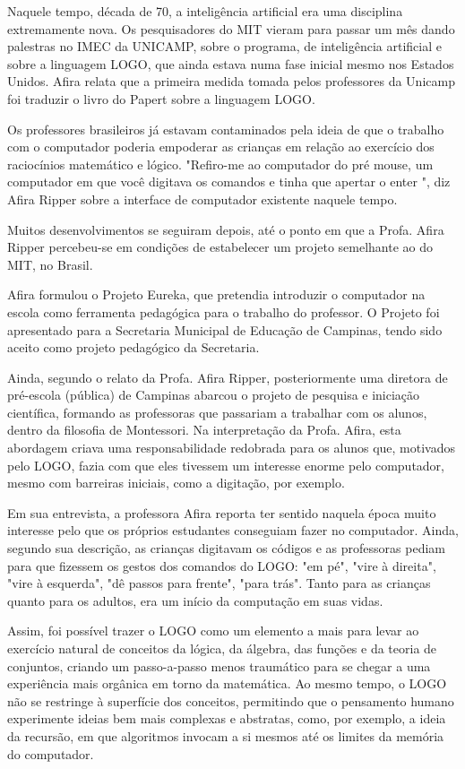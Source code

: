 Naquele tempo, década de 70, a inteligência artificial era uma disciplina extremamente nova. Os pesquisadores do MIT vieram para passar um mês dando palestras no IMEC da UNICAMP, sobre o programa, de inteligência artificial e sobre a linguagem LOGO, que ainda estava numa fase inicial mesmo nos Estados Unidos. Afira relata que a primeira medida tomada pelos professores da Unicamp foi traduzir o livro do Papert sobre a linguagem LOGO.

Os professores brasileiros já estavam contaminados pela ideia de que o trabalho com o computador poderia empoderar as crianças em relação ao exercício dos raciocínios matemático e lógico. "Refiro-me ao computador do pré mouse, um computador em que você digitava os comandos e tinha que apertar o enter ", diz Afira Ripper sobre a interface de computador existente naquele tempo.

Muitos desenvolvimentos se seguiram depois, até o ponto em que a Profa. Afira Ripper percebeu-se em condições de estabelecer um projeto semelhante ao do MIT, no Brasil.

Afira formulou o Projeto Eureka, que pretendia introduzir o computador na escola como ferramenta pedagógica para o trabalho do professor. O Projeto foi apresentado para a Secretaria Municipal de Educação de Campinas, tendo sido aceito como projeto pedagógico da Secretaria.

Ainda, segundo o relato da Profa. Afira Ripper, posteriormente uma diretora de pré-escola (pública) de Campinas abarcou o projeto de pesquisa e iniciação científica, formando as professoras que passariam a trabalhar com os alunos, dentro da filosofia de Montessori. Na interpretação da Profa. Afira, esta abordagem criava uma responsabilidade redobrada para os alunos que, motivados pelo LOGO, fazia com que eles tivessem um interesse enorme pelo computador, mesmo com barreiras iniciais, como a digitação, por exemplo.

Em sua entrevista, a professora Afira reporta ter sentido naquela época muito interesse pelo que os próprios estudantes conseguiam fazer no computador. Ainda, segundo sua descrição, as crianças digitavam os códigos e as professoras pediam para que fizessem os gestos dos comandos do LOGO: "em pé", "vire à direita", "vire à esquerda", "dê passos para frente", "para trás". Tanto para as crianças quanto para os adultos, era um início da computação em suas vidas.

Assim, foi possível trazer o LOGO como um elemento a mais para levar ao exercício natural de conceitos da lógica, da álgebra, das funções e da teoria de conjuntos, criando um passo-a-passo menos traumático para se chegar a uma experiência mais orgânica em torno da matemática. Ao mesmo tempo, o LOGO não se restringe à superfície dos conceitos, permitindo que o pensamento humano experimente ideias bem mais complexas e abstratas, como, por exemplo, a ideia da recursão, em que algoritmos invocam a si mesmos até os limites da memória do computador.

